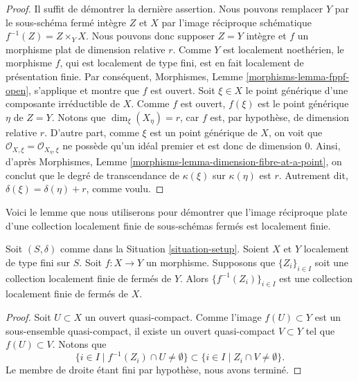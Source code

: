 \begin{proof}
Il suffit de démontrer la dernière assertion.
Nous pouvons remplacer $Y$ par le sous-schéma fermé intègre $Z$ et
$X$ par l'image réciproque schématique $f^{-1}(Z) = Z \times_Y X$.
Nous pouvons donc supposer $Z = Y$ intègre et $f$ un morphisme plat
de dimension relative $r$. Comme $Y$ est localement noethérien, le
morphisme $f$, qui est localement de type fini,
est en fait localement de présentation finie. Par conséquent,
Morphismes, Lemme \ref{morphisms-lemma-fppf-open},
s'applique et montre que $f$ est ouvert.
Soit $\xi \in X$ le point générique d'une composante irréductible
de $X$. Comme $f$ est ouvert, $f(\xi)$ est le
point générique $\eta$ de $Z = Y$. Notons que $\dim_\xi(X_\eta) = r$,
car $f$ est, par hypothèse, de dimension relative $r$. D'autre
part, comme $\xi$ est un point générique de $X$, on voit que
$\mathcal{O}_{X, \xi} = \mathcal{O}_{X_\eta, \xi}$ ne possède qu'un
idéal premier et est donc de dimension $0$. Ainsi, d'après
Morphismes, Lemme \ref{morphisms-lemma-dimension-fibre-at-a-point},
on conclut que le degré de transcendance
de $\kappa(\xi)$ sur $\kappa(\eta)$ est $r$.
Autrement dit, $\delta(\xi) = \delta(\eta) + r$, comme voulu.
\end{proof}

\noindent
Voici le lemme que nous utiliserons pour démontrer que l'image réciproque plate
d'une collection localement finie de sous-schémas fermés est localement finie.

\begin{lemma}
\label{lemma-inverse-image-locally-finite}
Soit $(S, \delta)$ comme dans la Situation \ref{situation-setup}.
Soient $X$ et $Y$ localement de type fini sur $S$.
Soit $f : X \to Y$ un morphisme.
Supposons que $\{Z_i\}_{i \in I}$ soit une collection localement
finie de fermés de $Y$.
Alors $\{f^{-1}(Z_i)\}_{i \in I}$ est une collection localement finie
de fermés de $X$.
\end{lemma}

\begin{proof}
Soit $U \subset X$ un ouvert quasi-compact.
Comme l'image $f(U) \subset Y$ est un sous-ensemble quasi-compact,
il existe un ouvert quasi-compact $V \subset Y$ tel que
$f(U) \subset V$. Notons que
$$
\{i \in I \mid f^{-1}(Z_i) \cap U \not = \emptyset \}
\subset
\{i \in I \mid Z_i \cap V \not = \emptyset \}.
$$
Le membre de droite étant fini par hypothèse, nous avons terminé.
\end{proof}



